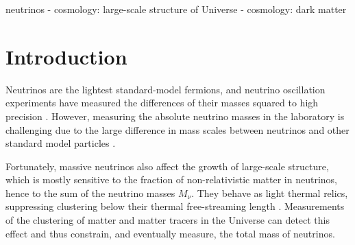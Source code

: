 \documentclass[useAMS, usenatbib]{mnras}
\begin{document}
\begin{keywords}
        neutrinos - cosmology: large-scale structure of Universe - cosmology: dark matter
\end{keywords}

\section{Introduction}

Neutrinos are the lightest standard-model fermions, and neutrino oscillation experiments have measured the differences of their masses squared to high precision \citep{Becker-Szendy_1992, Fukuda_1998, deSalas_17}. However, measuring the absolute neutrino masses in the laboratory is challenging due to the large difference in mass scales between neutrinos and other standard model particles \cite[although see][]{Wolf_2010}.




Fortunately, massive neutrinos %
also affect the growth of large-scale structure, which is mostly sensitive to the fraction of non-relativistic matter in neutrinos, hence to the sum of the neutrino masses $M_\nu$. They behave as light thermal relics, suppressing clustering below their thermal
free-streaming length \citep[e.g.][]{Lesgourgues_2006, Wong_2011}.
Measurements of the clustering of matter and matter tracers in the Universe can detect this effect and thus constrain, and eventually measure, the total mass of neutrinos.
\end{document}
